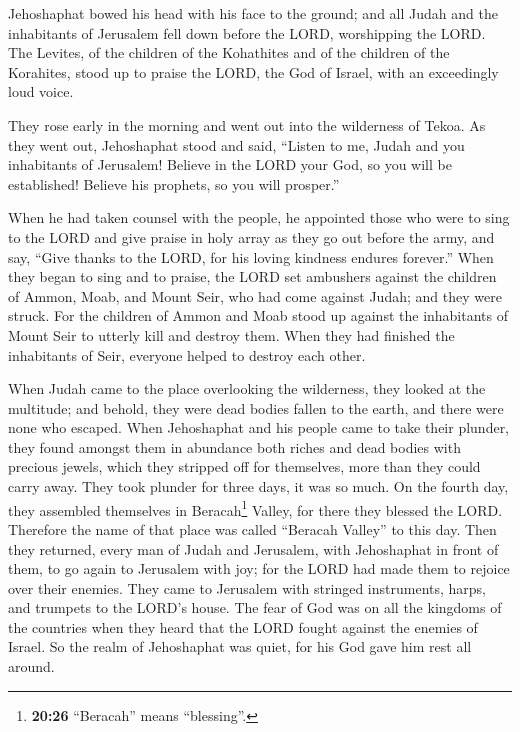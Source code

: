  Jehoshaphat bowed his head with his face to the ground;
and all Judah and the inhabitants of Jerusalem fell down before the
LORD, worshipping the LORD.  The Levites, of the children
of the Kohathites and of the children of the Korahites, stood up to
praise the LORD, the God of Israel, with an exceedingly loud voice.

 They rose early in the morning and went out into the
wilderness of Tekoa. As they went out, Jehoshaphat stood and said,
``Listen to me, Judah and you inhabitants of Jerusalem! Believe in the
LORD your God, so you will be established! Believe his prophets, so you
will prosper.''

 When he had taken counsel with the people, he appointed
those who were to sing to the LORD and give praise in holy array as they
go out before the army, and say, ``Give thanks to the LORD, for his
loving kindness endures forever.''  When they began to
sing and to praise, the LORD set ambushers against the children of
Ammon, Moab, and Mount Seir, who had come against Judah; and they were
struck.  For the children of Ammon and Moab stood up
against the inhabitants of Mount Seir to utterly kill and destroy them.
When they had finished the inhabitants of Seir, everyone helped to
destroy each other.

 When Judah came to the place overlooking the wilderness,
they looked at the multitude; and behold, they were dead bodies fallen
to the earth, and there were none who escaped.  When
Jehoshaphat and his people came to take their plunder, they found
amongst them in abundance both riches and dead bodies with precious
jewels, which they stripped off for themselves, more than they could
carry away. They took plunder for three days, it was so much.
 On the fourth day, they assembled themselves in
Beracah\footnote{\textbf{20:26} ``Beracah'' means ``blessing''.} Valley,
for there they blessed the LORD. Therefore the name of that place was
called ``Beracah Valley'' to this day.  Then they
returned, every man of Judah and Jerusalem, with Jehoshaphat in front of
them, to go again to Jerusalem with joy; for the LORD had made them to
rejoice over their enemies.  They came to Jerusalem with
stringed instruments, harps, and trumpets to the LORD's house.
 The fear of God was on all the kingdoms of the countries
when they heard that the LORD fought against the enemies of Israel.
 So the realm of Jehoshaphat was quiet, for his God gave
him rest all around.

